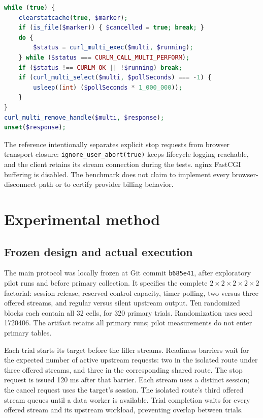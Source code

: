 \documentclass[11pt,a4paper]{article}
\begin{document}
\begin{lstlisting}[float=t,language=PHP,caption={Core timed-observation pattern; the complete authenticated implementation is in the artifact.}]
while (true) {
    clearstatcache(true, $marker);
    if (is_file($marker)) { $cancelled = true; break; }
    do {
        $status = curl_multi_exec($multi, $running);
    } while ($status === CURLM_CALL_MULTI_PERFORM);
    if ($status !== CURLM_OK || !$running) break;
    if (curl_multi_select($multi, $pollSeconds) === -1) {
        usleep((int) ($pollSeconds * 1_000_000));
    }
}
curl_multi_remove_handle($multi, $response);
unset($response);
\end{lstlisting}

The reference intentionally separates explicit stop requests from browser transport closure: \texttt{ignore\_user\_abort(true)} keeps lifecycle logging reachable, and the client retains its stream connection during the tests. nginx FastCGI buffering is disabled. The benchmark does not claim to implement every browser-disconnect path or to certify provider billing behavior.

\section{Experimental method}
\subsection{Frozen design and actual execution}
The main protocol was locally frozen at Git commit \texttt{b685e41}, after exploratory pilot runs and before primary collection. It specifies the complete $2\times2\times2\times2\times2$ factorial: session release, reserved control capacity, timer polling, two versus three offered streams, and regular versus silent upstream output. Ten randomized blocks each contain all 32 cells, for 320 primary trials. Randomization uses seed 1720406. The artifact retains all primary runs; pilot measurements do not enter primary tables.

Each trial starts its target before the filler streams. Readiness barriers wait for the expected number of active upstream requests: two in the isolated route under three offered streams, and three in the corresponding shared route. The stop request is issued 120 ms after that barrier. Each stream uses a distinct session; the cancel request uses the target's session. The isolated route's third offered stream queues until a data worker is available. Trial completion waits for every offered stream and its upstream workload, preventing overlap between trials.
\end{document}
